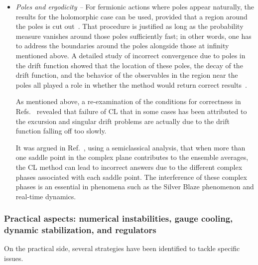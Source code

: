 \documentclass[../main.tex]{subfiles}
\begin{document}
\begin{itemize}
\begin{itemize}
\item {\it Poles and ergodicity --} For fermionic actions where poles appear naturally, the results for the holomorphic case can be used, provided that
a region around the poles is cut out~\cite{CLZeroesFermionDet}. That procedure is justified as long as the probability measure vanishes around
those poles sufficiently fast; in other words, one has to address the boundaries around the poles alongside those at infinity mentioned above.
A detailed study of incorrect convergence due to poles in the drift function showed that the location of these poles,
the decay of the drift function, and the behavior of the observables in the region near the poles all played a role in whether the method
would return correct results~\cite{CLZeroesFermionDet, CLJustificationPRD94114515}.

As mentioned above, a re-examination of the conditions for correctness in Refs.~\cite{PhysRevD.92.011501, CLJustificationPRD94114515}
revealed that failure of CL that in some cases has been attributed to the excursion and singular drift problems are actually due to the drift function
falling off too slowly.

It was argued in Ref.~\cite{Hayata:2015lzj}, using a semiclassical analysis, that when more than one saddle point in the complex plane contributes to the
ensemble averages, the CL method can lead to incorrect answers due to the different complex phases associated with each saddle point.
The interference of these complex phases is an essential in phenomena such as the Silver Blaze phenomenon and real-time dynamics.

\end{itemize}

\end{itemize}


\subsubsection{Practical aspects: numerical instabilities, gauge cooling, dynamic stabilization, and regulators}

On the practical side, several strategies have been identified to tackle specific issues.
\end{document}
